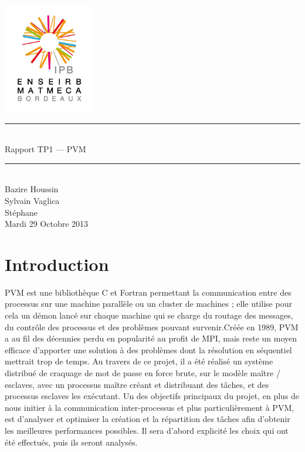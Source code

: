 \documentclass[a4paper,11pt]{article}
\begin{document}
\begin{titlepage}
  \begin{center}

    \begin{center}
      \includegraphics[width=4cm]{EM.jpg}
    \end{center}

    \vspace*{1cm}
        
    \rule{0.75\linewidth}{0.7mm}\\[0.4cm]
    {\Huge Rapport TP1 --- PVM\\[0.4cm]}
    \rule{0.75\linewidth}{0.7mm} \\[1.5cm]

    {\Large Bazire Houssin\\Sylvain Vaglica\\Stéphane \\[2cm]}
    {\Large Mardi 29 Octobre 2013}
  \end{center}
\end{titlepage}

\tableofcontents
\clearpage
\section{Introduction}

PVM est une bibliothèque C et Fortran permettant la communication entre des processus sur une machine parallèle ou un cluster de machines ; elle utilise pour cela un démon lancé sur chaque machine qui se charge du routage des messages, du contrôle des processus et des problèmes pouvant survenir.Créée en 1989, PVM a au fil des décennies perdu en popularité au profit de MPI, mais reste un moyen efficace d'apporter une solution à des problèmes dont la résolution en séquentiel mettrait trop de temps. Au travers de ce projet, il a été réalisé un système distribué de craquage de mot de passe en force brute, sur le modèle maître / esclaves, avec un processus maître créant et distribuant des tâches, et des processus esclaves les exécutant. Un des objectifs principaux du projet, en plus de nous initier à la communication inter-processus et plus particulièrement à PVM, est d'analyser et optimiser la création et la répartition des tâches afin d'obtenir les meilleures performances possibles. Il sera d'abord explicité les choix qui ont été effectués, puis ils seront analysés.
\end{document}
